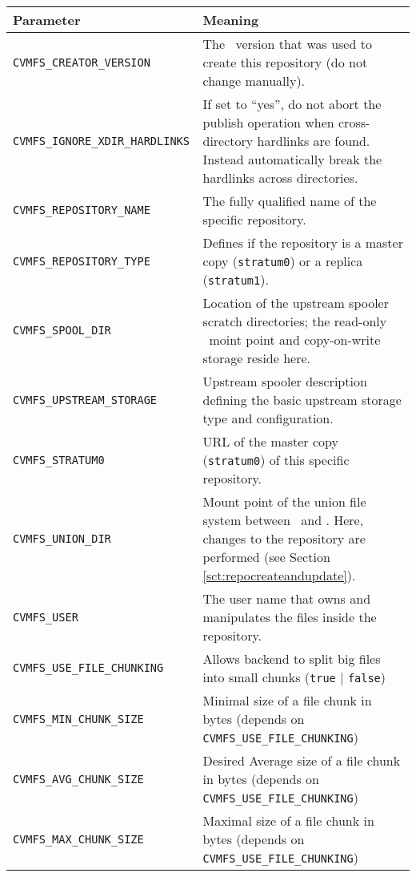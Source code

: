 	\begin{longtable}{lX}
		\toprule
		{\bf\centering Parameter} 			& {\bf\centering Meaning}\\
		\midrule
		\tt CVMFS\_CREATOR\_VERSION			& The \cvmfs\ version that was used to create this repository (do not change manually).\\
		\tt CVMFS\_IGNORE\_XDIR\_HARDLINKS		& If set to ``yes'', do not abort the publish operation when cross-directory hardlinks are found.  Instead automatically break the hardlinks across directories.\\
		\tt CVMFS\_REPOSITORY\_NAME			& The fully qualified name of the specific repository.\\
		\tt CVMFS\_REPOSITORY\_TYPE			& Defines if the repository is a master copy (\texttt{stratum0}) or a replica (\texttt{stratum1}).\\
		\tt CVMFS\_SPOOL\_DIR					& Location of the upstream spooler scratch directories; the read-only \cvmfs\ moint point and copy-on-write storage reside here.\\
		\tt CVMFS\_UPSTREAM\_STORAGE			& Upstream spooler description defining the basic upstream storage type and configuration.\\
		\tt CVMFS\_STRATUM0					& URL of the master copy (\texttt{stratum0}) of this specific repository.\\
		\tt CVMFS\_UNION\_DIR					& Mount point of the union file system between \cvmfs\ and \aufs. Here, changes to the repository are performed (see Section \ref{sct:repocreateandupdate}).\\
		\tt CVMFS\_USER						& The user name that owns and manipulates the files inside the repository.\\
		\tt CVMFS\_USE\_FILE\_CHUNKING		& Allows backend to split big files into small chunks (\texttt{true} | \texttt{false})\\
		\tt CVMFS\_MIN\_CHUNK\_SIZE			& Minimal size of a file chunk in bytes \newline (depends on \texttt{CVMFS\_USE\_FILE\_CHUNKING})\\
		\tt CVMFS\_AVG\_CHUNK\_SIZE			& Desired Average size of a file chunk in bytes \newline (depends on \texttt{CVMFS\_USE\_FILE\_CHUNKING})\\
		\tt CVMFS\_MAX\_CHUNK\_SIZE			& Maximal size of a file chunk in bytes \newline (depends on \texttt{CVMFS\_USE\_FILE\_CHUNKING})\\
		\bottomrule
	\end{longtable}
